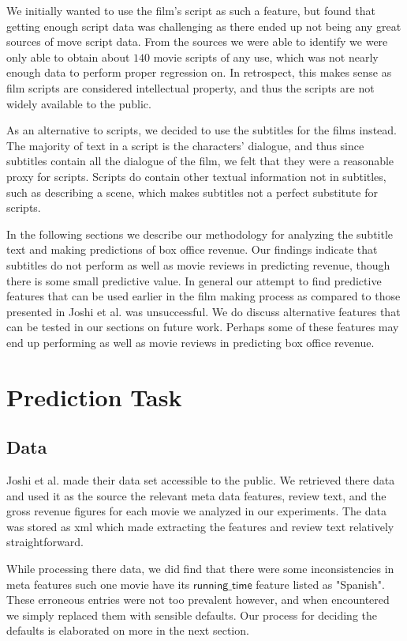 \documentclass[11pt]{article}
\begin{document}
We initially wanted to use the film's script as such a feature, but found that getting
enough script data was challenging as there ended up not being any great sources of
move script data. From the sources we were able to identify we were only able to
obtain about $140$ movie scripts of any use, which was not nearly enough data to perform
proper regression on. In retrospect, this makes sense as film scripts are considered
intellectual property, and thus the scripts are not widely available to the public.

As an alternative to scripts, we decided to use the subtitles for the films instead. The
majority of text in a script is the characters' dialogue, and thus since subtitles contain
all the dialogue of the film, we felt that they were a reasonable proxy for scripts.
Scripts do contain other textual information not in subtitles, such as describing a scene,
which makes subtitles not a perfect substitute for scripts.

In the following sections we describe our methodology for analyzing the subtitle text
and making predictions of box office revenue. Our findings indicate that subtitles do
not perform as well as movie reviews in predicting revenue, though there is some small
predictive value. In general our attempt to find predictive features that can be used
earlier in the film making process as compared to those presented in Joshi et al. was 
unsuccessful. We do discuss alternative features that can be tested in our sections on
future work. Perhaps some of these features may end up performing as well as movie reviews
in predicting box office revenue.

\section{Prediction Task}
\subsection{Data}
Joshi et al. made their data set accessible to the public. We retrieved there data
and used it as the source the relevant meta data features, review text, and the gross revenue figures for each movie we analyzed in our experiments. The data was stored as
xml which made extracting the features and review text relatively straightforward.

While processing there data, we 
did find that there were some inconsistencies in meta features such one movie
have its $\mathsf{running\_time}$ feature listed as "Spanish". These erroneous entries
were not too prevalent however, and when encountered we simply replaced them with
sensible defaults. Our process for deciding the defaults is elaborated on more in the
next section.
\end{document}
